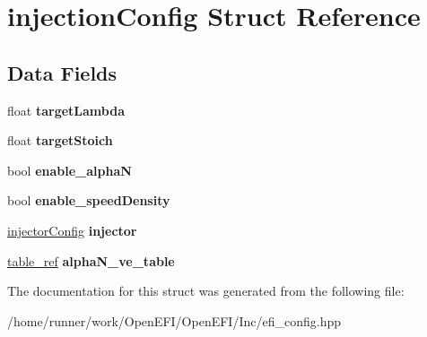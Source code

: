 \hypertarget{structinjectionConfig}{}\section{injection\+Config Struct Reference}
\label{structinjectionConfig}
\subsection*{Data Fields}
\begin{DoxyCompactItemize}
\item 
\mbox{\label{structinjectionConfig_ac33b690e3684ab7bb8cf241d1de6d297}} 
float {\bfseries target\+Lambda}
\item 
\mbox{\label{structinjectionConfig_aa0b6bb473884a0e06f213d4100f8a367}} 
float {\bfseries target\+Stoich}
\item 
\mbox{\label{structinjectionConfig_a3a1bb6dcae0801607ca1e202f3ed9b24}} 
bool {\bfseries enable\+\_\+alphaN}
\item 
\mbox{\label{structinjectionConfig_abe9b6913115d9ebd555b45291c0c2739}} 
bool {\bfseries enable\+\_\+speed\+Density}
\item 
\mbox{\label{structinjectionConfig_ab7565261450fb83cdefa9a43f9abb508}} 
\hyperlink{structinjectorConfig}{injector\+Config} {\bfseries injector}
\item 
\mbox{\label{structinjectionConfig_ab8622def6a5a7cd8f7f9daefc7e92add}} 
\hyperlink{structtable__ref}{table\+\_\+ref} {\bfseries alpha\+N\+\_\+ve\+\_\+table}
\end{DoxyCompactItemize}


The documentation for this struct was generated from the following file\+:\begin{DoxyCompactItemize}
\item 
/home/runner/work/\+Open\+E\+F\+I/\+Open\+E\+F\+I/\+Inc/efi\+\_\+config.\+hpp\end{DoxyCompactItemize}
